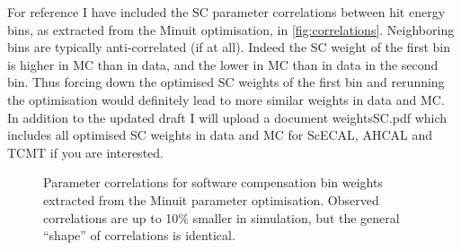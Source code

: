 \documentclass[twoside,a4paper,12pt]{article}
\begin{document}
For reference I have included the SC parameter correlations between hit energy bins, as extracted from the Minuit optimisation, in \autoref{fig:correlations}. Neighboring bins are typically anti-correlated (if at all). Indeed the SC weight of the first bin is higher in MC than in data, and the lower in MC than in data in the second bin. Thus forcing down the optimised SC weights of the first bin and rerunning the optimisation would definitely lead to more similar weights in data and MC. In addition to the updated draft I will upload a document weightsSC.pdf which includes all optimised SC weights in data and MC for ScECAL, AHCAL and TCMT if you are interested.
\begin{figure}[htbp]
	\hfill
	
	\caption[]{Parameter correlations for software compensation bin weights extracted from the Minuit parameter optimisation. Observed correlations are up to 10\% smaller in simulation, but the general ``shape'' of correlations is identical.}
	\label{fig:correlations}
\end{figure} 
\end{document}
